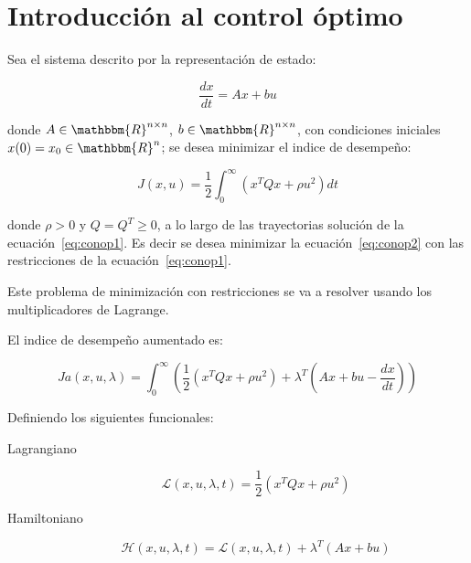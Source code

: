 
\chapter{Introducción al control óptimo}

    Sea el sistema descrito por la representación de estado:

    \begin{equation} \label{eq:conop1}
        \frac{dx}{dt} = A x + b u
    \end{equation}

    donde $A \in \mathbbm{R}^{n \times n}$, $b \in \mathbbm{R}^{n \times n}$, con condiciones iniciales $x(0) = x_0 \in \mathbbm{R}^n$; se desea minimizar el indice de desempeño:

    \begin{equation} \label{eq:conop2}
        J(x, u) = \frac{1}{2} \int_0^{\infty} \left( x^T Q x + \rho u^2 \right) dt
    \end{equation}

    donde $\rho > 0$ y $Q = Q^T \ge 0$, a lo largo de las trayectorias solución de la ecuación~\ref{eq:conop1}. Es decir se desea minimizar la ecuación~\ref{eq:conop2} con las restricciones de la ecuación~\ref{eq:conop1}.

    Este problema de minimización con restricciones se va a resolver usando los multiplicadores de Lagrange.

    El indice de desempeño aumentado es:

    \begin{equation*}
        Ja(x, u, \lambda) = \int_0^{\infty} \left( \frac{1}{2}  \left( x^T Q x + \rho u^2 \right) + \lambda^T \left( Ax + bu - \frac{dx}{dt} \right) \right)
    \end{equation*}

    Definiendo los siguientes funcionales:

    \begin{description}
        \item [Lagrangiano]
        \begin{equation}
            \mathscr{L}(x, u, \lambda, t) = \frac{1}{2} \left( x^T Q x + \rho u^2 \right)
        \end{equation}
        \item [Hamiltoniano]
        \begin{equation}
            \mathscr{H}(x, u, \lambda, t) = \mathscr{L}(x, u, \lambda, t) + \lambda^T (A x + b u)
        \end{equation}
    \end{description}

